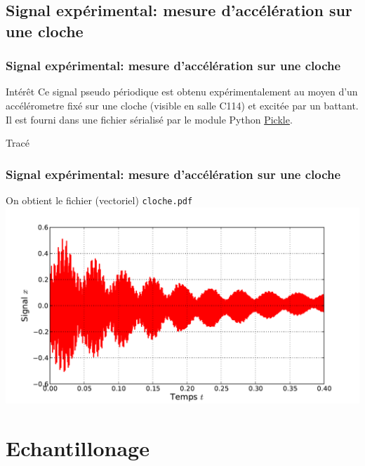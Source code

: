 \documentclass[8pt,a4paper]{beamer}
\begin{document}
  \subsection{Signal expérimental: mesure d'accélération sur une cloche}
  \begin{frame}[containsverbatim]
  \frametitle{Signal expérimental: mesure d'accélération sur une cloche}
  \begin{block}{Intérêt}
  Ce signal pseudo périodique est obtenu expérimentalement au moyen d'un accélérometre fixé sur une cloche (visible en salle C114) et excitée par un battant. Il est fourni dans une fichier sérialisé par le module Python \href{http://docs.python.org/library/pickle.html}{Pickle}.  
  \end{block}
  \begin{block}{Tracé}
  
  \end{block}
  \end{frame}
  \begin{frame}[containsverbatim]
  \frametitle{Signal expérimental: mesure d'accélération sur une cloche}
  On obtient le fichier (vectoriel) \lstinline!cloche.pdf!\\  
  \includegraphics[width=1.\textwidth]{figures/cloche.pdf}
  \end{frame}

\section{Echantillonage}
\end{document}
